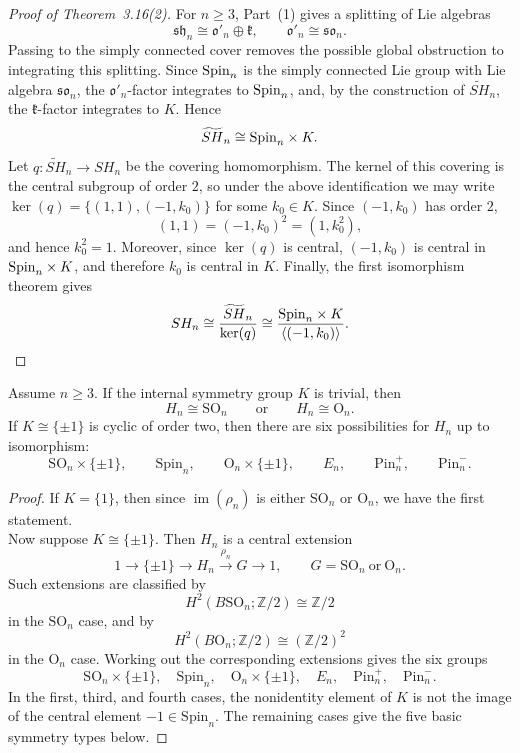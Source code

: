 \documentclass[a4paper,11pt]{article}
\begin{document}
\begin{proof}[Proof of Theorem~3.16(2)]
For $n\geq 3$, Part~(1) gives a splitting of Lie algebras
\[
    \mathfrak{sh}_n\cong\mathfrak{o}'_n\oplus\mathfrak{k},
    \qquad
    \mathfrak{o}'_n\cong\mathfrak{so}_n.
\]
Passing to the simply connected cover removes the possible global obstruction to integrating this splitting. Since ${\rm Spin}_n$ is the simply
connected Lie group with Lie algebra $\mathfrak{so}_n$, the $\mathfrak{o}'_n$-factor integrates to ${\rm Spin}_n$, and, by the construction
of $\widetilde{SH}_n$, the $\mathfrak{k}$-factor integrates to $K$. Hence
\[
    \widetilde{SH}_n\cong{\rm Spin}_n\times K.
\]
Let $q:\widetilde{SH}_n\longrightarrow SH_n$ be the covering homomorphism. The kernel of this covering is the central subgroup of order $2$, so under the above identification we may write $\ker(q)=\{(1,1),(-1,k_0)\}$ for some $k_0\in K$. Since $(-1,k_0)$ has order $2$,
\[
    (1,1)=(-1,k_0)^2=(1,k_0^2),
\]
and hence $k_0^2=1$. Moreover, since $\ker(q)$ is central, $(-1,k_0)$ is central in ${\rm Spin}_n\times K$, and therefore $k_0$ is
central in $K$. Finally, the first isomorphism theorem gives
\[
    SH_n
    \cong
    \frac{\widetilde{SH}_n}{\ker(q)}
    \cong
    \frac{{\rm Spin}_n\times K}
         {\langle(-1,k_0)\rangle}.
\]
\end{proof}


\begin{proposition}[Proposition 2.16]
Assume $n\geq 3$. If the internal symmetry group $K$ is trivial, then
\[
    H_n\cong \mathrm{SO}_n
    \qquad\text{or}\qquad
    H_n\cong \mathrm{O}_n.
\]
If $K\cong\{\pm1\}$ is cyclic of order two, then there are six possibilities for $H_n$ up to isomorphism:
\[
    \mathrm{SO}_n\times\{\pm1\},\qquad
    \mathrm{Spin}_n,\qquad
    \mathrm{O}_n\times\{\pm1\},\qquad
    E_n,\qquad
    \mathrm{Pin}_n^+,\qquad
    \mathrm{Pin}_n^-.
\]
\end{proposition}

\begin{proof}
If $K=\{1\}$, then since $\operatorname{im}(\rho_n)$ is either $\mathrm{SO}_n$ or $\mathrm{O}_n$, we have the first statement.\\

Now suppose $K\cong\{\pm1\}$. Then $H_n$ is a central extension
\[
    1\longrightarrow\{\pm1\}\longrightarrow H_n
    \overset{\rho_n}{\longrightarrow}G\longrightarrow1,
    \qquad
    G=\mathrm{SO}_n\ \text{or}\ \mathrm{O}_n.
\]
Such extensions are classified by
\[
    H^2(B\mathrm{SO}_n;\mathbb Z/2)\cong\mathbb Z/2
\]
in the $\mathrm{SO}_n$ case, and by
\[
    H^2(B\mathrm{O}_n;\mathbb Z/2)
    \cong(\mathbb Z/2)^2
\]
in the $\mathrm{O}_n$ case. Working out the corresponding extensions gives the six groups
\[
    \mathrm{SO}_n\times\{\pm1\},\quad
    \mathrm{Spin}_n,\quad
    \mathrm{O}_n\times\{\pm1\},\quad
    E_n,\quad
    \mathrm{Pin}_n^+,\quad
    \mathrm{Pin}_n^-.
\]
In the first, third, and fourth cases, the nonidentity element of $K$ is not
the image of the central element $-1\in\mathrm{Spin}_n$. The remaining cases
give the five basic symmetry types below.
\end{proof}
\end{document}
